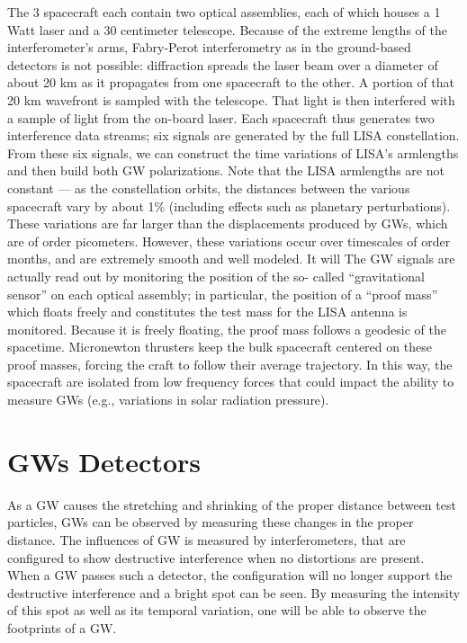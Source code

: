 \documentclass[binding=0.6cm, LaM]{sapthesis}
\begin{document}
The 3 spacecraft each contain two optical assemblies, each of which houses a 1 Watt laser and a 30 centimeter telescope.
 Because of the extreme lengths of the interferometer’s arms, Fabry-Perot interferometry as in the ground-based detectors is not possible:
diffraction spreads the laser beam over a diameter of about 20 km as it propagates from one spacecraft to the other. A portion of that 20 km wavefront is sampled with the telescope.
That light is then interfered with a sample of light from the on-board laser. Each spacecraft thus generates two interference data streams; six signals are generated by the full LISA constellation.
From these six signals, we can construct the time variations of LISA’s armlengths and then build both GW polarizations.
Note that the LISA armlengths are not constant — as the constellation orbits, the distances between the various spacecraft vary by about 1\% (including effects such as planetary perturbations).
These variations are far larger than the displacements produced by GWs, which are of order picometers.
However, these variations occur over timescales of order months, and are extremely smooth and well modeled. It will
 The GW signals are actually read out by monitoring the position of the so- called “gravitational sensor” on each optical assembly; in particular, the position of a “proof mass” which floats freely
 and constitutes the test mass for the LISA antenna is monitored. Because it is freely floating, the proof mass follows a geodesic of the spacetime.
Micronewton thrusters keep the bulk spacecraft centered on these proof masses, forcing the craft to follow their average trajectory.
In this way, the spacecraft are isolated from low frequency forces that could impact the ability to measure GWs (e.g., variations in solar radiation pressure).


\section{GWs Detectors}
As a GW causes the stretching and shrinking of the proper distance between test particles, GWs can be observed by measuring these changes in the proper distance.
The influences of GW is measured by interferometers, that are configured to show destructive interference when no distortions are present.
When a GW passes such a detector, the configuration will no longer support the destructive interference and a bright spot can be seen.
By measuring the intensity of this spot as well as its temporal variation, one will be able to observe the footprints of a GW.
\end{document}
